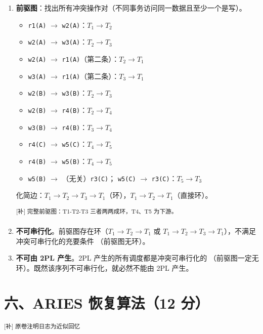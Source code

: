 \documentclass[11pt,a4paper]{article}
\newcommand{\supp}[1]{\textcolor{ansred}{\textsuperscript{[补] #1}}}
\begin{document}
\begin{enumerate}[label=(\arabic*),leftmargin=*]

  \item \textbf{前驱图}：找出所有冲突操作对（不同事务访问同一数据且至少一个是写）。

  \begin{itemize}[nosep]
    \item \texttt{r1(A)} $\to$ \texttt{w2(A)}：$T_1 \to T_2$
    \item \texttt{w2(A)} $\to$ \texttt{w3(A)}：$T_2 \to T_3$
    \item \texttt{w2(A)} $\to$ \texttt{r1(A)}（第二条）：$T_2 \to T_1$
    \item \texttt{w3(A)} $\to$ \texttt{r1(A)}（第二条）：$T_3 \to T_1$
    \item \texttt{w2(B)} $\to$ \texttt{w3(B)}：$T_2 \to T_3$
    \item \texttt{w2(B)} $\to$ \texttt{r4(B)}：$T_2 \to T_4$
    \item \texttt{w3(B)} $\to$ \texttt{r4(B)}：$T_3 \to T_4$
    \item \texttt{r4(C)} $\to$ \texttt{w5(C)}：$T_4 \to T_5$
    \item \texttt{r4(B)} $\to$ \texttt{w5(B)}：$T_4 \to T_5$
    \item \texttt{w5(B)} $\to$ （无关）\texttt{r3(C)}；
          \texttt{w5(C)} $\to$ \texttt{r3(C)}：$T_5 \to T_3$
  \end{itemize}

  化简边：$T_1 \to T_2 \to T_3 \to T_1$（环），$T_1 \to T_2 \to T_1$（直接环）。

  \supp{完整前驱图：T1-T2-T3 三者两两成环，T4、T5 为下游。}

  \item \textbf{不可串行化}。前驱图存在环（$T_1 \to T_2 \to T_1$ 或
        $T_1 \to T_2 \to T_3 \to T_1$），不满足冲突可串行化的充要条件
        （前驱图无环）。

  \item \textbf{不可由 2PL 产生}。2PL 产生的所有调度都是冲突可串行化的
        （前驱图一定无环）。既然该序列不可串行化，就必然不能由 2PL 产生。

\end{enumerate}

\newpage
\section*{六、ARIES 恢复算法（12 分）}

\supp{原卷注明日志为近似回忆}
\end{document}
